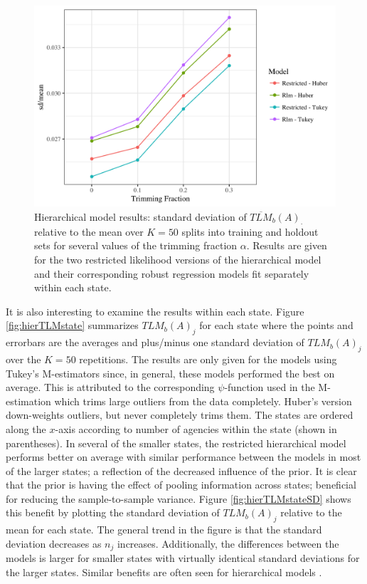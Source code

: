 \documentclass[ba]{imsart}
\begin{document}
\begin{figure}[t]
\centering
\includegraphics[width=6in]{hier_sd_tlm.png}
\caption{Hierarchical model results: standard deviation of $\overline{TLM}_b(A)_{\cdot}$ relative to the mean over $K = 50$ splits into training and holdout sets for several values of the trimming fraction $\alpha$. Results are given for the two restricted likelihood versions of the hierarchical model and their corresponding robust regression models fit separately within each state.}
\label{fig:hierTLMsd}
\end{figure}

It is also interesting to examine the results within each state. Figure \ref{fig:hierTLMstate} summarizes ${TLM}_b(A)_{j}$ for each state where the points and errorbars are the averages and plus/minus one standard deviation of ${TLM}_b(A)_{j}$ over the $K = 50$ repetitions. The results are only given for the models using Tukey's M-estimators since, in general, these models performed the best on average. This is attributed to the corresponding $\psi$-function used in the M-estimation which trims large outliers from the data completely. Huber's version down-weights outliers, but never completely trims them.  The states are ordered along the $x$-axis according to number of agencies within the state (shown in parentheses). In several of the smaller states, the restricted hierarchical model performs better on average with similar performance between the models in most of the larger states; a reflection of the decreased influence of the prior. It is clear that the prior is having the effect of pooling information across states; beneficial for reducing the sample-to-sample variance. Figure \ref{fig:hierTLMstateSD} shows this benefit by plotting the standard deviation of ${TLM}_b(A)_{j}$ relative to the mean for each state. The general trend in the figure is that the standard deviation decreases as $n_{j}$ increases. Additionally, the differences between the models is larger for smaller states with virtually identical standard deviations for the larger states. Similar benefits are often seen for hierarchical models \citep[e.g.,][]{gelman2006}. 
\end{document}
